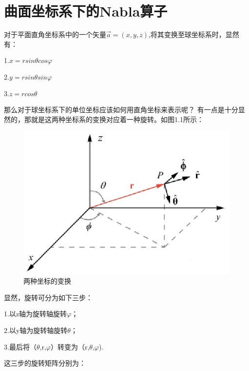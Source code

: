 \documentclass[a4paper,12pt,oneside]{ctexbook}
\begin{document}
\section{曲面坐标系下的Nabla算子}
对于平面直角坐标系中的一个矢量$\vec{a}=(x,y,z)$,将其变换至球坐标系时，显然有：\par
1.$x=rsin$$\theta$$cos\varphi$\par 
2.$y=rsin$$\theta$$sin\varphi$\par
3.$z=rcos$$\theta$\par
那么对于球坐标系下的单位坐标应该如何用直角坐标来表示呢？
有一点是十分显然的，那就是这两种坐标系的变换对应着一种旋转。如图1.1所示：\par 
\begin{figure}[htpb]
	\centering
	\includegraphics[scale=1]{坐标变换.eps}
	\caption{两种坐标的变换}
	\label{figure}
\end{figure}%
显然，旋转可分为如下三步：\par
1.以z轴为旋转轴旋转$\varphi$；\par 
2.以y轴为旋转轴旋转$\theta$；\par 
3.最后将（$\theta$,r,$\varphi$）转变为（r,$\theta$,$\varphi$).\par
这三步的旋转矩阵分别为：\par 
$$
\end{document}
